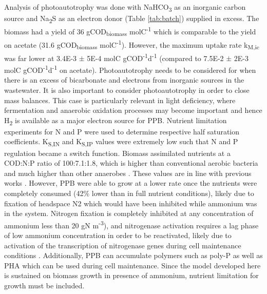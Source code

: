 \skippingparagraph
Analysis of photoautotrophy was done with NaHCO\textsubscript{3} as an inorganic carbon source and Na\textsubscript{2}S as an electron donor (Table \ref{tab:batch}) supplied in excess. The biomass had a yield of 36 gCOD\textsubscript{biomass} molC\textsuperscript{-1} which is comparable to the yield on acetate (31.6 gCOD\textsubscript{biomass} molC\textsuperscript{-1}). However, the maximum uptake rate k\textsubscript{M,ic} was far lower at \num{3.4E-3} $\pm$ \num{5E-4} molC gCOD\textsuperscript{-1}d\textsuperscript{-1} (compared to \num{7.5E-2} $\pm$ \num{2E-3} molC gCOD\textsuperscript{-1}d\textsuperscript{-1} on acetate). Photoautotrophy needs to be considered for when there is an excess of bicarbonate and electrons from inorganic sources in the wastewater. It is also important to consider photoautotrophy in order to close mass balances. This case is particularly relevant in light deficiency, where fermentation and anaerobic oxidation processes may become important and hence H\textsubscript{2} is available as a major electron source for PPB.
\skippingparagraph
Nutrient limitation experiments for N and P were used to determine respective half saturation coefficients. K\textsubscript{S,IN} and K\textsubscript{S,IP} values were extremely low such that N and P regulation became a switch function. Biomass assimilated nutrients at a COD:N:P ratio of 100:7.1:1.8, which is higher than conventional aerobic bacteria and much higher than other anaerobes \cite{Tchobanoglous}. These values are in line with previous works \cite{Hulsen2014}. However, PPB were able to grow at a lower rate once the nutrients were completely consumed (42\% lower than in full nutrient conditions), likely due to fixation of headspace N2 \cite{Hunter2008} which would have been inhibited while ammonium was in the system. Nitrogen fixation is completely inhibited at any concentration of ammonium less than 20 gN m\textsuperscript{-3}), and nitrogenase activation requires a lag phase of low ammonium concentration in order to be reactivated, likely due to activation of the transcription of nitrogenase genes during cell maintenance conditions \cite{Masepohl2002}. Additionally, PPB can accumulate polymers such as poly-P \cite{Liang2010} as well as PHA \cite{Melnicki2009} which can be used during cell maintenance. Since the model developed here is sustained on biomass growth in presence of ammonium, nutrient limitation for growth must be included.

